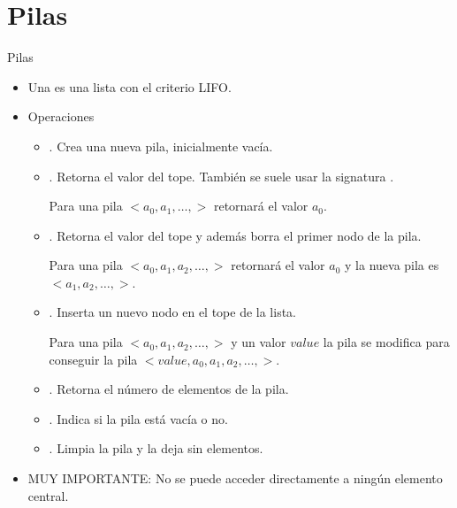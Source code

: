 \documentclass[10pt,envcountsect,spanish]{beamer}
\begin{document}
\section{Pilas}

\begin{frame}{Pilas}

\begin{itemize}
\item Una  es una lista con el criterio LIFO.

\item Operaciones
\begin{itemize}
\item {}. Crea una nueva pila, inicialmente vacía.

\item {}. Retorna el valor del tope. También se suele usar la signatura .

Para una pila  $<a_0, a_1, \ldots,>$ retornará el valor $a_0$.

\item {}. Retorna el valor del tope y además borra el primer nodo de la pila.

Para una pila  $<a_0, a_1, a_2, \ldots,>$ retornará el valor $a_0$ y la nueva pila es  $<a_1, a_2, \ldots,>$.


\item {}. Inserta un nuevo nodo en el tope de la lista. 

Para una pila  $<a_0, a_1, a_2, \ldots,>$ y un valor $value$ la pila se modifica para conseguir la pila $<value, a_0, a_1, a_2, \ldots,>$.


\item {}. Retorna el número de elementos de la pila.

\item {}. Indica si la pila está vacía o no.

\item {}. Limpia la pila y la deja sin elementos.

\end{itemize}

\item MUY IMPORTANTE: No se puede acceder directamente a ningún elemento central.


\end{itemize}

\end{frame}
\end{document}
